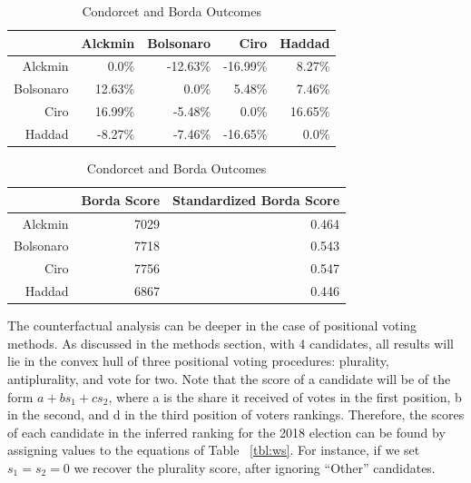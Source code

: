 \documentclass[hidelinks,11pt]{article}
\begin{document}
\begin{table}
  \begin{adjustwidth}{3cm}{}
\begin{subtable}[t]{0.48\textwidth}
\centering
          \begin{tabular}{rrrrr}
            &  Alckmin & Bolsonaro & Ciro & Haddad
            \\\hline
            Alckmin & 0.0\% & -12.63\% & -16.99\% & 8.27\% \\
            Bolsonaro & 12.63\% & 0.0\% & 5.48\% & 7.46\% \\
            Ciro & 16.99\% & -5.48\% & 0.0\% & 16.65\% \\
            Haddad & -8.27\% & -7.46\% & -16.65\% & 0.0\% \\\hline
          \end{tabular}
    \caption{Pairwise Margins}
     \label{tbl:margins}
   \end{subtable}
   \vspace*{0.3cm}

\begin{subtable}[t]{0.48\textwidth}
\centering
\begin{tabular}{rrr}
  \hline
 & Borda Score  & Standardized Borda Score\\
  \hline
Alckmin & 7029 & 0.464 \\
  Bolsonaro & 7718 & 0.543 \\
  Ciro & 7756 &  0.547\\
  Haddad & 6867 & 0.446 \\
   \hline
\end{tabular}
\caption{Borda Count Outcome}
\label{tbl:borda}
\end{subtable}
\end{adjustwidth}
\caption{Condorcet and Borda Outcomes}
\label{tbl:overallresult}
\end{table}

The counterfactual analysis can be deeper in the case of positional voting
methods. As discussed in the methods section, with 4 candidates, all results
will lie in the convex hull of three positional voting procedures: plurality,
antiplurality, and vote for two. Note that the score of a candidate will be of
the form \(a + bs_{1} + cs_{2}\), where a is the share it received of votes in
the first position, b in the second, and d in the third position of voters
rankings. Therefore, the scores of each candidate in the inferred ranking for
the 2018 election can be found by assigning values to the equations of Table
~\ref{tbl:ws}. For instance, if we set \(s_{1} = s_{2} = 0\) we recover the
plurality score, after ignoring ``Other'' candidates.
\end{document}

